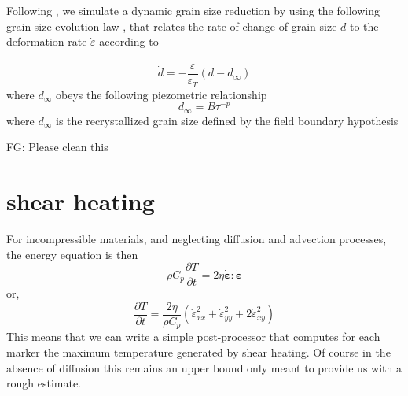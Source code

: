 \documentclass[a4paper]{article}
\begin{document}
Following \textcite{prgu09}, we simulate a dynamic grain size reduction
by using the following grain size evolution law \textcite{brcp99}, that relates
the rate of change of grain size $\dot{d}$ to the 
deformation rate $\dot{\varepsilon}$ according to

\[
\dot{d} = -\frac{\dot\varepsilon}{\dot\varepsilon_T} (d-d_\infty)
\]
where $d_\infty$ obeys the following piezometric 
relationship
\[
d_\infty = B \tau^{-p}
\]
where $d_\infty$ is the recrystallized grain size defined
by the field boundary hypothesis

FG: Please clean this 

\section{shear heating}

For incompressible materials, and neglecting diffusion and advection processes, the energy equation is then
\[
\rho C_p \frac{\partial T}{\partial t} = 2 \eta \dot{\bm \varepsilon}:\dot{\bm \varepsilon}
\]
or, 
\[
\frac{\partial T}{\partial t} = \frac{2 \eta}{\rho C_p} (\dot{\varepsilon}_{xx}^2 + \dot{\varepsilon}_{yy}^2 + 2\dot{\varepsilon}_{xy}^2 ) 
\]
This means that we can write a simple post-processor that computes for each marker the maximum temperature
generated by shear heating. Of course in the absence of diffusion this remains an upper bound only meant 
to provide us with a rough estimate.


\newpage
\printbibliography
\end{document}
